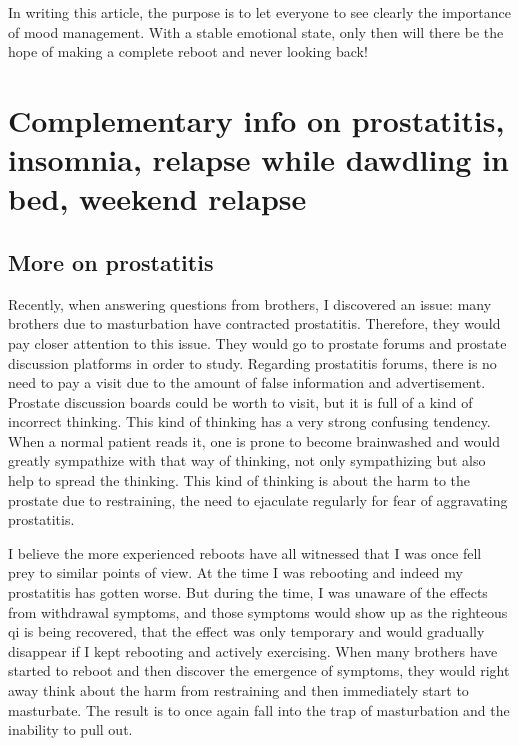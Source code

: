 \documentclass[
]{book}
\begin{document}
In writing this article, the purpose is to let everyone to see clearly the importance of mood management. With a stable emotional state, only then will there be the hope of making a complete reboot and never looking back!

\hypertarget{complementary-info-on-prostatitis-insomnia-relapse-while-dawdling-in-bed-weekend-relapse}{%
\chapter{Complementary info on prostatitis, insomnia, relapse while dawdling in bed, weekend relapse}\label{complementary-info-on-prostatitis-insomnia-relapse-while-dawdling-in-bed-weekend-relapse}}

\hypertarget{more-on-prostatitis}{%
\section{More on prostatitis}\label{more-on-prostatitis}}

Recently, when answering questions from brothers, I discovered an issue: many brothers due to masturbation have contracted prostatitis. Therefore, they would pay closer attention to this issue. They would go to prostate forums and prostate discussion platforms in order to study. Regarding prostatitis forums, there is no need to pay a visit due to the amount of false information and advertisement. Prostate discussion boards could be worth to visit, but it is full of a kind of incorrect thinking. This kind of thinking has a very strong confusing tendency. When a normal patient reads it, one is prone to become brainwashed and would greatly sympathize with that way of thinking, not only sympathizing but also help to spread the thinking. This kind of thinking is about the harm to the prostate due to restraining, the need to ejaculate regularly for fear of aggravating prostatitis.

I believe the more experienced reboots have all witnessed that I was once fell prey to similar points of view. At the time I was rebooting and indeed my prostatitis has gotten worse. But during the time, I was unaware of the effects from withdrawal symptoms, and those symptoms would show up as the righteous qi is being recovered, that the effect was only temporary and would gradually disappear if I kept rebooting and actively exercising. When many brothers have started to reboot and then discover the emergence of symptoms, they would right away think about the harm from restraining and then immediately start to masturbate. The result is to once again fall into the trap of masturbation and the inability to pull out.
\end{document}
